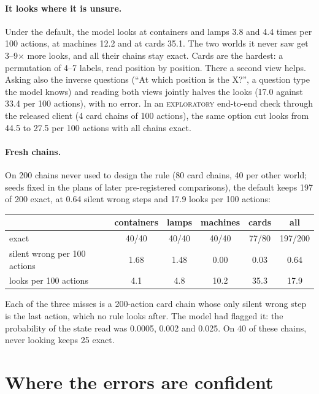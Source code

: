 \documentclass[11pt]{article}
\newcommand{\explo}{\textsc{exploratory}}
\begin{document}
\paragraph{It looks where it is unsure.} Under the default, the model looks at containers and lamps 3.8 and 4.4 times
per 100 actions, at machines 12.2 and at cards 35.1. The two worlds it never saw get 3--9$\times$ more looks, and all
their chains stay exact. Cards are the hardest: a permutation of 4--7 labels, read position by position. There a
second view helps. Asking also the inverse questions (``At which position is the X?'', a question type the model knows)
and reading both views jointly halves the looks (17.0 against 33.4 per 100 actions), with no error. In an
\explo{} end-to-end check through the released client (4 card chains of 100 actions), the same option cut looks from
44.5 to 27.5 per 100 actions with all chains exact.

\paragraph{Fresh chains.} On 200 chains never used to design the rule (80 card chains, 40 per other world; seeds fixed
in the plans of later pre-registered comparisons), the default keeps 197 of 200 exact, at 0.64 silent wrong steps and
17.9 looks per 100 actions:

\begin{center}\small
\begin{tabular}{lcccc|c}
\toprule
 & containers & lamps & machines & cards & all \\
\midrule
exact & 40/40 & 40/40 & 40/40 & 77/80 & 197/200 \\
silent wrong per 100 actions & 1.68 & 1.48 & 0.00 & 0.03 & 0.64 \\
looks per 100 actions & 4.1 & 4.8 & 10.2 & 35.3 & 17.9 \\
\bottomrule
\end{tabular}
\end{center}

Each of the three misses is a 200-action card chain whose only silent wrong step is the last action, which no rule
looks after. The model had flagged it: the probability of the state read was 0.0005, 0.002 and 0.025. On 40 of these
chains, never looking keeps 25 exact.

\section{Where the errors are confident}\label{sec:confident}
\end{document}
